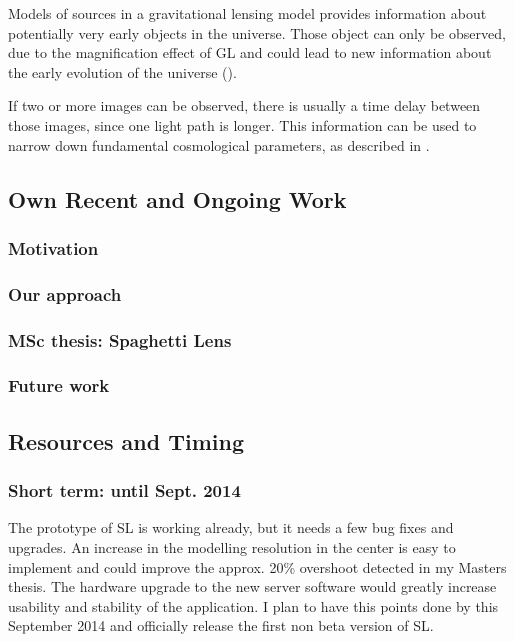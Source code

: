 \documentclass[11pt]{article}
\begin{document}
Models of sources in a gravitational lensing model provides information about potentially very early objects in the universe.
Those object can only be observed, due to the magnification effect of GL and could lead to new information about the early evolution of the universe (\cite{rusin03}).

If two or more images can be observed, there is usually a time delay between those images, since one light path is longer.
This information can be used to narrow down fundamental cosmological parameters, as described in \cite{refsdal1964}.


\subsection{Own Recent and Ongoing Work}

\subsubsection{Motivation}

\subsubsection{Our approach}

\subsubsection{MSc thesis: Spaghetti Lens}

\subsubsection{Future work}


\subsection{Resources and Timing}

\subsubsection{Short term: until Sept. 2014}
The prototype of SL is working already, but it needs a few bug fixes and upgrades.
An increase in the modelling resolution in the center is easy to implement and could improve the approx. 20\% overshoot detected in my Masters thesis.
The hardware upgrade to the new server software would greatly increase usability and stability of the application.
I plan to have this points done by this September 2014 and officially release the first non beta version of SL.
\end{document}
